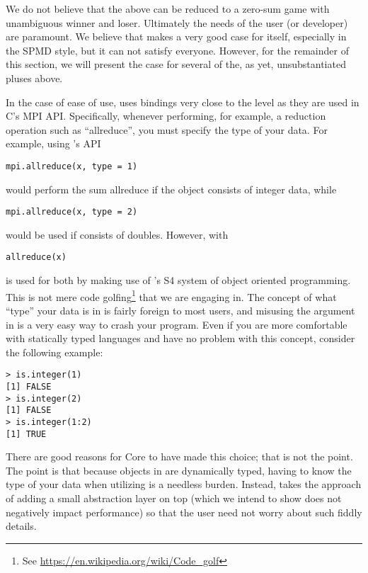 We do not believe that the above can be reduced to a zero-sum game with
unambiguous winner and loser. Ultimately the needs of the user (or
developer) are paramount. We believe that \pbdR
makes a very good case for itself, especially in the SPMD style,
but it can not satisfy everyone. However, for the remainder of this
section, we will present the case for several of the, as yet,
unsubstantiated pluses above.

In the case of ease of use,  uses bindings very close to the
level as they are used in C's MPI API. Specifically, whenever performing,
for example, a reduction operation such as ``allreduce'', you must specify the
type of your data. For example, using 's API
\begin{lstlisting}[language=rr]
mpi.allreduce(x, type = 1)
\end{lstlisting}
would perform the sum allreduce if the object  consists of integer
data, while
\begin{lstlisting}[language=rr]
mpi.allreduce(x, type = 2)
\end{lstlisting}
would be used if  consists of doubles. However, with 
\begin{lstlisting}[language=rr]
allreduce(x)
\end{lstlisting}
is used for both by making use of 's S4 system of object
oriented programming. This is not mere code
golfing\footnote{See \url{https://en.wikipedia.org/wiki/Code_golf}}
that we are engaging in. The concept of what ``type'' your data is
in  is fairly foreign to most  users, and
misusing the  argument in  is a very easy way
to crash your program. Even if you are more comfortable with statically
typed languages and have no problem with this concept, consider the
following example:

\begin{lstlisting}[language=rr,title=Types in R]
> is.integer(1)
[1] FALSE
> is.integer(2)
[1] FALSE
> is.integer(1:2)
[1] TRUE
\end{lstlisting}

There are good reasons for  Core to have made this choice;
that is not the point. The point is that because objects in
 are dynamically typed, having to know the type of your
data when utilizing  is a needless burden. Instead,
 takes the approach of adding a small abstraction
layer on top (which we intend to show does not negatively impact
performance) so that the user need not worry about such fiddly details.

